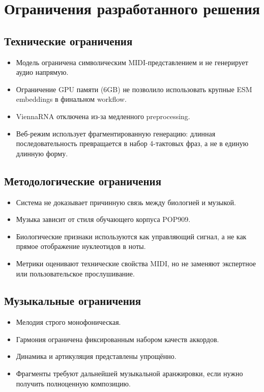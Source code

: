 \section{Ограничения разработанного решения}

\subsection{Технические ограничения}

\begin{itemize}
\item Модель ограничена символическим MIDI-представлением и не генерирует аудио напрямую.
\item Ограничение GPU памяти (6GB) не позволило использовать крупные ESM embeddings в финальном workflow.
\item ViennaRNA отключена из-за медленного preprocessing.
\item Веб-режим использует фрагментированную генерацию: длинная последовательность превращается в набор 4-тактовых фраз, а не в единую длинную форму.
\end{itemize}

\subsection{Методологические ограничения}

\begin{itemize}
\item Система не доказывает причинную связь между биологией и музыкой.
\item Музыка зависит от стиля обучающего корпуса POP909.
\item Биологические признаки используются как управляющий сигнал, а не как прямое отображение нуклеотидов в ноты.
\item Метрики оценивают технические свойства MIDI, но не заменяют экспертное или пользовательское прослушивание.
\end{itemize}

\subsection{Музыкальные ограничения}

\begin{itemize}
\item Мелодия строго монофоническая.
\item Гармония ограничена фиксированным набором качеств аккордов.
\item Динамика и артикуляция представлены упрощённо.
\item Фрагменты требуют дальнейшей музыкальной аранжировки, если нужно получить полноценную композицию.
\end{itemize}

